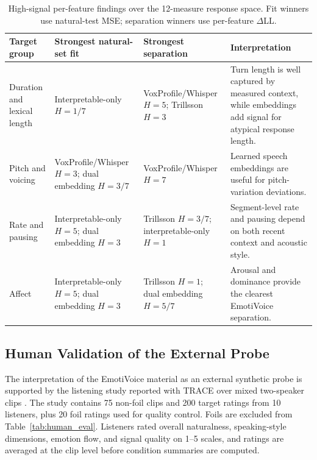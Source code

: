 \documentclass[conference]{IEEEtran}
\begin{document}
\begin{table}[t]
\centering
\caption{High-signal per-feature findings over the 12-measure response space. Fit winners use natural-test MSE; separation winners use per-feature $\Delta$LL.}
\label{tab:per_feature}
\scriptsize
\setlength{\tabcolsep}{3.2pt}
\begin{tabular}{p{}p{}p{}p{}}
\toprule
Target group & Strongest natural-set fit & Strongest separation & Interpretation \\
\midrule
Duration and lexical length & Interpretable-only $H=1/7$ & VoxProfile/Whisper $H=5$; Trillsson $H=3$ & Turn length is well captured by measured context, while embeddings add signal for atypical response length. \\
Pitch and voicing & VoxProfile/Whisper $H=3$; dual embedding $H=3/7$ & VoxProfile/Whisper $H=7$ & Learned speech embeddings are useful for pitch-variation deviations. \\
Rate and pausing & Interpretable-only $H=5$; dual embedding $H=3$ & Trillsson $H=3/7$; interpretable-only $H=1$ & Segment-level rate and pausing depend on both recent context and acoustic style. \\
Affect & Interpretable-only $H=5$; dual embedding $H=3$ & Trillsson $H=1$; dual embedding $H=5/7$ & Arousal and dominance provide the clearest EmotiVoice separation. \\
\bottomrule
\end{tabular}
\end{table}

\subsection{Human Validation of the External Probe}
The interpretation of the EmotiVoice material as an external synthetic probe is supported by the listening study reported with TRACE over mixed two-speaker clips \cite{TRACE}.
The study contains 75 non-foil clips and 200 target ratings from 10 listeners, plus 20 foil ratings used for quality control.
Foils are excluded from Table~\ref{tab:human_eval}.
Listeners rated overall naturalness, speaking-style dimensions, emotion flow, and signal quality on 1--5 scales, and ratings are averaged at the clip level before condition summaries are computed.
\end{document}
